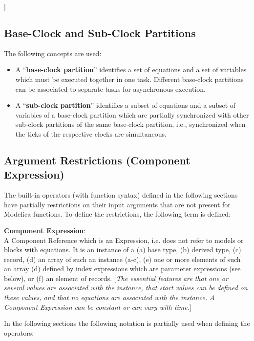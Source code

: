 \documentclass[10pt,a4paper]{report}
\def\doublelabel#1{\label{#1}}
\begin{document}
{]}

\subsection{Base-Clock and Sub-Clock Partitions}\doublelabel{base-clock-and-sub-clock-partitions}

The following concepts are used:

\begin{itemize}
\item
  A ``\textbf{base-clock partition}'' identifies a set of equations and
  a set of variables which must be executed together in one task.
  Different base-clock partitions can be associated to separate tasks
  for asynchronous execution.
\item
  A ``\textbf{sub-clock partition}'' identifies a subset of equations
  and a subset of variables of a base-clock partition which are
  partially synchronized with other sub-clock partitions of the same
  base-clock partition, i.e., synchronized when the ticks of the
  respective clocks are simultaneous.
\end{itemize}

\subsection{Argument Restrictions (Component Expression)}\doublelabel{argument-restrictions-component-expression}

The built-in operators (with function syntax) defined in the following
sections have partially restrictions on their input arguments that are
not present for Modelica functions. To define the restrictions, the
following term is defined:

\textbf{Component Expression}:\\
A Component Reference which is an Expression, i.e. does not refer to
models or blocks with equations. It is an instance of a (a) base type,
(b) derived type, (c) record, (d) an array of such an instance (a-c),
(e) one or more elements of such an array (d) defined by index
expressions which are parameter expressions (see below), or (f) an
element of records. {[}\emph{The essential features are that one or
several values are associated with the instance, that start values can
be defined on these values, and that no equations are associated with
the instance. A Component Expression can be constant or can vary with
time.}{]}

In the following sections the following notation is partially used when
defining the operators:
\end{document}
